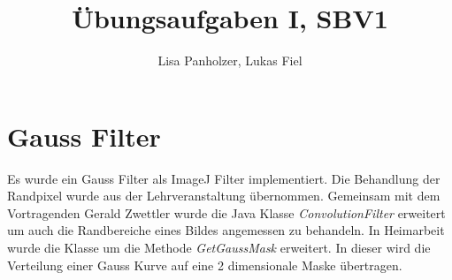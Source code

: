\documentclass[12pt,german]{article}
\begin{document}
\title{Übungsaufgaben I, SBV1 }
\author{Lisa Panholzer, Lukas Fiel}
\maketitle


\newpage
\section{Gauss Filter}
Es wurde ein Gauss Filter als ImageJ Filter implementiert. Die Behandlung der Randpixel wurde aus der Lehrveranstaltung übernommen. Gemeinsam mit dem Vortragenden Gerald Zwettler wurde die Java Klasse \textit{ConvolutionFilter} erweitert um auch die Randbereiche eines Bildes angemessen zu behandeln. In Heimarbeit wurde die Klasse um die Methode \textit{GetGaussMask} erweitert. In dieser wird die Verteilung einer Gauss Kurve auf eine 2 dimensionale Maske übertragen. \\
\end{document}
